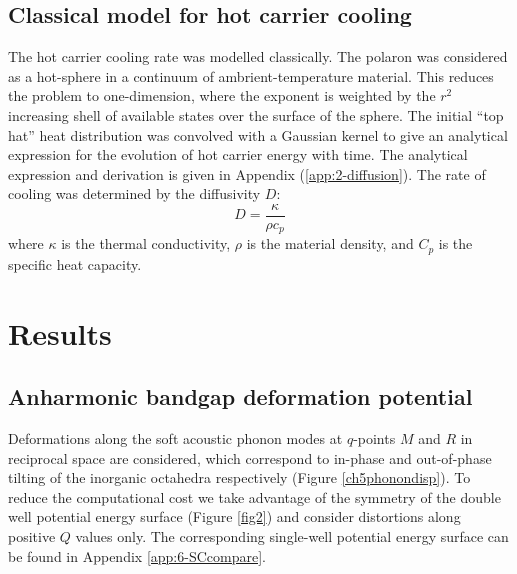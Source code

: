 \subsection{Classical model for hot carrier cooling}
The hot carrier cooling rate was modelled classically. The polaron was considered as a hot-sphere in a continuum of ambrient-temperature material. This reduces the problem to one-dimension, where the exponent is weighted by the $r^2$ increasing shell of available states over the surface of the sphere. 
The initial “top hat” heat distribution was convolved with a Gaussian kernel to give an analytical expression for the evolution of hot carrier energy with time. The analytical expression and derivation is given in Appendix (\ref{app:2-diffusion}).
The rate of cooling was determined by the diffusivity $D$:
\begin{equation}
    D = \frac{\kappa}{\rho c_p}
\end{equation}
where $\kappa$ is the thermal conductivity, $\rho$ is the material density, and $C_p$ is the specific heat capacity.

\section{Results}
\subsection{Anharmonic bandgap deformation potential}
Deformations along the soft acoustic phonon modes at $q$-points $M$ and $R$ in reciprocal space are considered, which correspond to in-phase and out-of-phase tilting of the inorganic octahedra respectively (Figure \ref{ch5phonondisp}).
To reduce the computational cost we take advantage of the symmetry of the double well potential energy surface (Figure \ref{fig2}) and consider distortions along positive $Q$ values only. The corresponding single-well potential energy surface can be found in Appendix \ref{app:6-SCcompare}.

